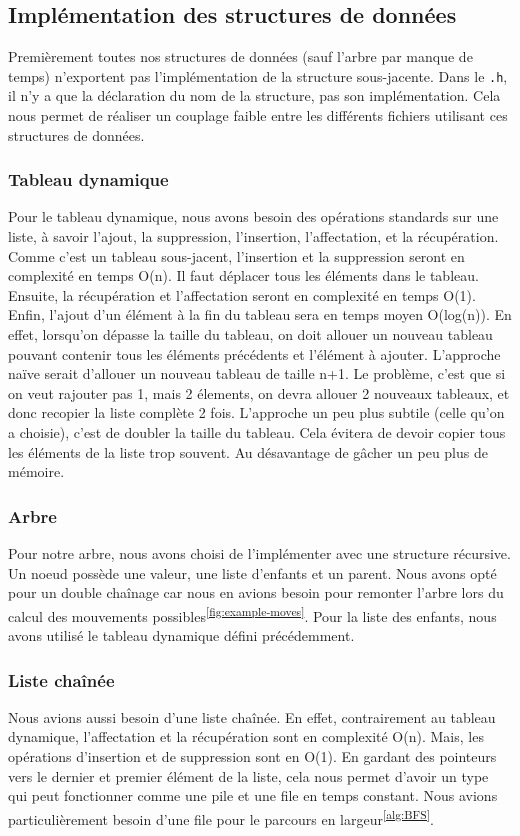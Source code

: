 \subsection{Implémentation des structures de données}
Premièrement toutes nos structures de données (sauf l'arbre par manque de temps)
n'exportent pas l'implémentation de la structure sous-jacente. Dans le \verb|.h|, il n'y a que la déclaration
du nom de la structure, pas son implémentation. Cela nous permet de réaliser un couplage faible
entre les différents fichiers utilisant ces structures de données.
\subsubsection{Tableau dynamique}
Pour le tableau dynamique, nous avons besoin des opérations standards 
sur une liste, à savoir l'ajout, la suppression, l'insertion, l'affectation, et la récupération.
Comme c'est un tableau sous-jacent, l'insertion et la suppression seront en complexité en temps O(n).
Il faut déplacer tous les éléments dans le tableau.
Ensuite, la récupération et l'affectation seront en complexité en temps O(1).
Enfin, l'ajout d'un élément à la fin du tableau sera en temps moyen O(log(n)).
En effet, lorsqu'on dépasse la taille du tableau, on doit allouer un nouveau tableau
pouvant contenir tous les éléments précédents et l'élément à ajouter.
L'approche naïve serait d'allouer un nouveau tableau de taille n+1. Le problème,
c'est que si on veut rajouter pas 1, mais 2 élements, on devra allouer 2 nouveaux tableaux, et donc recopier la liste complète 2 fois.
L'approche un peu plus subtile (celle qu'on a choisie), c'est de doubler la taille du tableau.
Cela évitera de devoir copier tous les éléments de la liste trop souvent. Au désavantage de gâcher un peu plus de mémoire.
\subsubsection{Arbre}
Pour notre arbre, nous avons choisi de l'implémenter avec une structure récursive.
Un noeud possède une valeur, une liste d'enfants et un parent.
Nous avons opté pour un double chaînage car nous en avions besoin pour remonter l'arbre
lors du calcul des mouvements possibles\textsuperscript{\ref{fig:example-moves}}.
Pour la liste des enfants, nous avons utilisé le tableau dynamique défini précédemment.
\subsubsection{Liste chaînée}
Nous avions aussi besoin d'une liste chaînée.
En effet, contrairement au tableau dynamique, l'affectation et la récupération sont en complexité O(n).
Mais, les opérations d'insertion et de suppression sont en O(1). En gardant
des pointeurs vers le dernier et premier élément de la liste, cela nous permet d'avoir un type
qui peut fonctionner comme une pile et une file en temps constant. Nous avions
particulièrement besoin d'une file pour le parcours en largeur\textsuperscript{\ref{alg:BFS}}.
